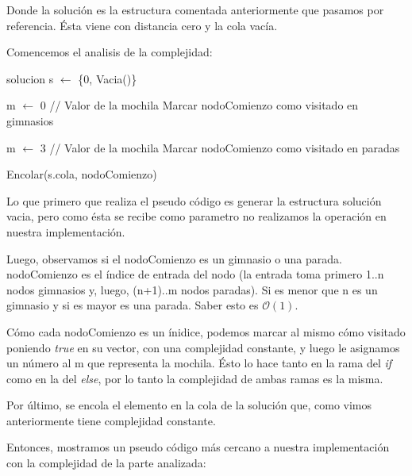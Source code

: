 Donde la solución es la estructura comentada anteriormente que pasamos por referencia. Ésta viene con distancia cero y la cola vacía.

Comencemos el analisis de la complejidad:

\begin{algorithm}[H]
\label{}
\begin{algorithmic}[]

\State solucion s $\leftarrow$ \{0, Vacia()\}


	\State m $\leftarrow$ 0  // Valor de la mochila
	\State Marcar nodoComienzo como visitado en gimnasios

\Else

	\State m $\leftarrow$ 3  // Valor de la mochila
	\State Marcar nodoComienzo como visitado en paradas

\EndIf

\State Encolar(s.cola, nodoComienzo)

\medskip
\Statex \underline{}
\end{algorithmic}
\end{algorithm}


Lo que primero que realiza el pseudo código es generar la estructura solución vacia, pero como ésta se recibe como parametro no realizamos la operación en nuestra implementación.

Luego, observamos si el nodoComienzo es un gimnasio o una parada. nodoComienzo es el índice de entrada del nodo (la entrada toma primero 1..n nodos gimnasios y, luego, (n+1)..m nodos paradas). Si es menor que n es un gimnasio y si es mayor es una parada. Saber esto es $\mathcal{O}(1)$.

Cómo cada nodoComienzo es un ínidice, podemos marcar al mismo cómo visitado poniendo \textit{true} en su vector, con una complejidad constante, y luego le asignamos un número al m que representa la mochila. Ésto lo hace tanto en la rama del \textit{if} como en la del \textit{else}, por lo tanto la complejidad de ambas ramas es la misma.

Por último, se encola el elemento en la cola de la solución que, como vimos anteriormente tiene complejidad constante.

Entonces, mostramos un pseudo código más cercano a nuestra implementación con la complejidad de la parte analizada:

